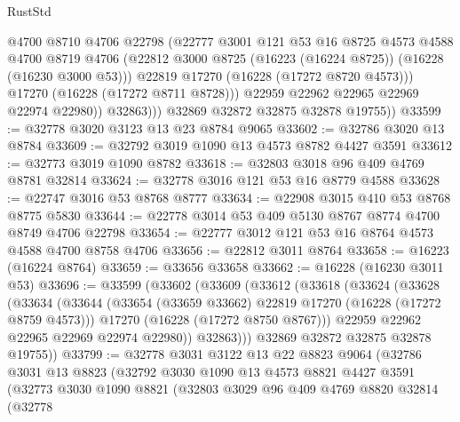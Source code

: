 \begin{lexlean}{RustStd}
\begin{coremodule}
                    @4700
                    @8710
                    @4706
                    @22798
                    (@22777
                      @3001
                      @121
                      @53
                      @16
                      @8725
                      @4573
                      @4588
                      @4700
                      @8719
                      @4706
                      (@22812 @3000 @8725 (@16223 (@16224 @8725)) (@16228 (@16230 @3000 @53)))
                      @22819
                      @17270
                      (@16228 (@17272 @8720 @4573)))
                    @17270
                    (@16228 (@17272 @8711 @8728)))
                  @22959
                  @22962
                  @22965
                  @22969
                  @22974
                  @22980))
              @32863)))
        @32869
        @32872
        @32875
        @32878
        @19755))
@33599 := @32778 @3020 @3123 @13 @23 @8784 @9065
@33602 := @32786 @3020 @13 @8784
@33609 := @32792 @3019 @1090 @13 @4573 @8782 @4427 @3591
@33612 := @32773 @3019 @1090 @8782
@33618 := @32803 @3018 @96 @409 @4769 @8781 @32814
@33624 := @32778 @3016 @121 @53 @16 @8779 @4588
@33628 := @22747 @3016 @53 @8768 @8777
@33634 := @22908 @3015 @410 @53 @8768 @8775 @5830
@33644 := @22778 @3014 @53 @409 @5130 @8767 @8774 @4700 @8749 @4706 @22798
@33654 := @22777 @3012 @121 @53 @16 @8764 @4573 @4588 @4700 @8758 @4706
@33656 := @22812 @3011 @8764
@33658 := @16223 (@16224 @8764)
@33659 := @33656 @33658
@33662 := @16228 (@16230 @3011 @53)
@33696 := @33599
    (@33602
      (@33609
        (@33612
          (@33618
            (@33624
              (@33628
                (@33634
                  (@33644
                    (@33654 (@33659 @33662) @22819 @17270 (@16228 (@17272 @8759 @4573)))
                    @17270
                    (@16228 (@17272 @8750 @8767)))
                  @22959
                  @22962
                  @22965
                  @22969
                  @22974
                  @22980))
              @32863)))
        @32869
        @32872
        @32875
        @32878
        @19755))
@33799 := @32778
    @3031
    @3122
    @13
    @22
    @8823
    @9064
    (@32786
      @3031
      @13
      @8823
      (@32792
        @3030
        @1090
        @13
        @4573
        @8821
        @4427
        @3591
        (@32773
          @3030
          @1090
          @8821
          (@32803
            @3029
            @96
            @409
            @4769
            @8820
            @32814
            (@32778

\end{coremodule}
\end{lexlean}
